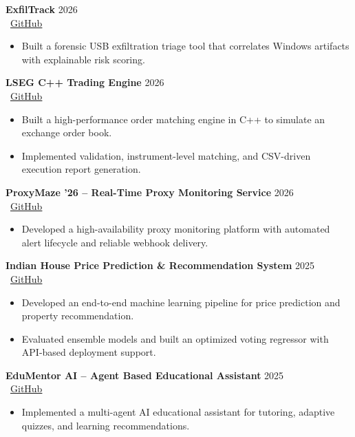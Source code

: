 \documentclass[a4paper,11pt]{article}
\begin{document}
\textbf{ExfilTrack} \hfill 2026
\\ \faGithub\ \href{https://github.com/ExfilTrack/Exfiltrack}{GitHub}
\begin{itemize}
    \item Built a forensic USB exfiltration triage tool that correlates Windows artifacts with explainable risk scoring.
\end{itemize}

\textbf{LSEG C++ Trading Engine} \hfill 2026
\\ \faGithub\ \href{https://github.com/lakaThabrew/Flower_stack_Exchange}{GitHub}
\begin{itemize}
    \item Built a high-performance order matching engine in C++ to simulate an exchange order book.
    \item Implemented validation, instrument-level matching, and CSV-driven execution report generation.
\end{itemize}

\textbf{ProxyMaze '26 -- Real-Time Proxy Monitoring Service} \hfill 2026
\\ \faGithub\ \href{https://github.com/TeamEchoBinary/ProxyMaze-26}{GitHub}
\begin{itemize}
    \item Developed a high-availability proxy monitoring platform with automated alert lifecycle and reliable webhook delivery.
\end{itemize}

\textbf{Indian House Price Prediction \& Recommendation System} \hfill 2025
\\ \faGithub\ \href{https://github.com/lakaThabrew/IDET_AI-capstone_project1}{GitHub}
\begin{itemize}
    \item Developed an end-to-end machine learning pipeline for price prediction and property recommendation.
    \item Evaluated ensemble models and built an optimized voting regressor with API-based deployment support.
\end{itemize}

\textbf{EduMentor AI -- Agent Based Educational Assistant} \hfill 2025
\\ \faGithub\ \href{https://github.com/lakaThabrew/edumentor-ai}{GitHub}
\begin{itemize}
    \item Implemented a multi-agent AI educational assistant for tutoring, adaptive quizzes, and learning recommendations.
\end{itemize}
\end{document}
